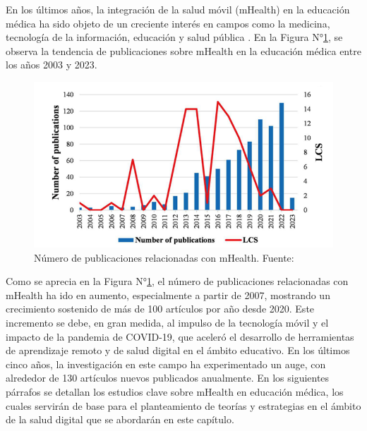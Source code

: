 
En los últimos años, la integración de la salud móvil (mHealth) en la educación médica ha sido objeto de un creciente interés en campos como la medicina, tecnología de la información, educación y salud pública \parencite{global_trends_mhealth_2023}. En la Figura N°\ref{7:fig}, se observa la tendencia de publicaciones sobre mHealth en la educación médica entre los años 2003 y 2023.

\begin{figure}[ht]
	\centering
	\includegraphics[width=\textwidth]{2/figures/Tendencia.png}
	\caption{Número de publicaciones relacionadas con mHealth. Fuente: \cite{global_trends_mhealth_2023}}
	\label{7:fig}
\end{figure}

Como se aprecia en la Figura N°\ref{7:fig}, el número de publicaciones relacionadas con mHealth ha ido en aumento, especialmente a partir de 2007, mostrando un crecimiento sostenido de más de 100 artículos por año desde 2020. Este incremento se debe, en gran medida, al impulso de la tecnología móvil y el impacto de la pandemia de COVID-19, que aceleró el desarrollo de herramientas de aprendizaje remoto y de salud digital en el ámbito educativo. En los últimos cinco años, la investigación en este campo ha experimentado un auge, con alrededor de 130 artículos nuevos publicados anualmente.
En los siguientes párrafos se detallan los estudios clave sobre mHealth en educación médica, los cuales servirán de base para el planteamiento de teorías y estrategias en el ámbito de la salud digital que se abordarán en este capítulo.


